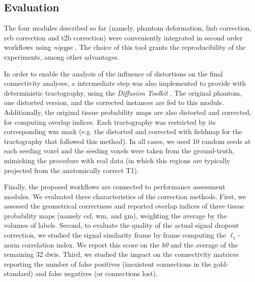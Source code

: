 \subsection{Evaluation}

The four modules described so far (namely, phantom
deformation, \gls*{fmb} correction, \gls*{reb}
correction and \gls*{t2b} correction) were conveniently
integrated in second order workflows using
\emph{nipype} \cite{gorgolewski_nipype:_2011}.
The choice of this tool grants the reproducibility
of the experiments, among other advantages.

In order to enable the analysis of the influence of
distortions on the final connectivity analyses,
a intermediate step was also implemented to
provide with deterministic tractography,
using the \emph{Diffusion Toolkit} \cite{wang_diffusion_2007}.
The original phantom, one distorted version, and
the corrected instances are fed to this module.
Additionally, the original tissue probability maps
are also distorted and corrected, for computing overlap
indices.
Each tractography was restricted by its corresponding 
\gls*{wm} mask (e.g. the distorted and corrected with
fieldmap for the tractography that followed this method). 
In all cases, we used 10 random seeds at each seeding
voxel and the seeding voxels were taken from the 
ground-truth, mimicking the procedure with real data
(in which this regions are typically projected from the
anatomically correct T1).

Finally, the proposed workflows are connected to performance
assessment modules. We evaluated three characteristics
of the correction methods. 
First, we assessed the geometrical correctness
and reported overlap indices of three tissue
probability maps (namely \gls*{csf}, \gls*{wm},
and \gls*{gm}),
weighting the average by the volumes of labels.
Second, to evaluate the quality of the actual 
signal dropout correction, we studied the 
signal similarity frame by frame computing the $\ell_1$-norm
correlation index. We report this score
on the \textit{b0} and the average of the remaining 32 
\glspl*{dwi}. Third, we studied the impact on the
connectivity matrices reporting the number of
false positives (inexistent connections in the
gold-standard) and false negatives (or connections
lost).